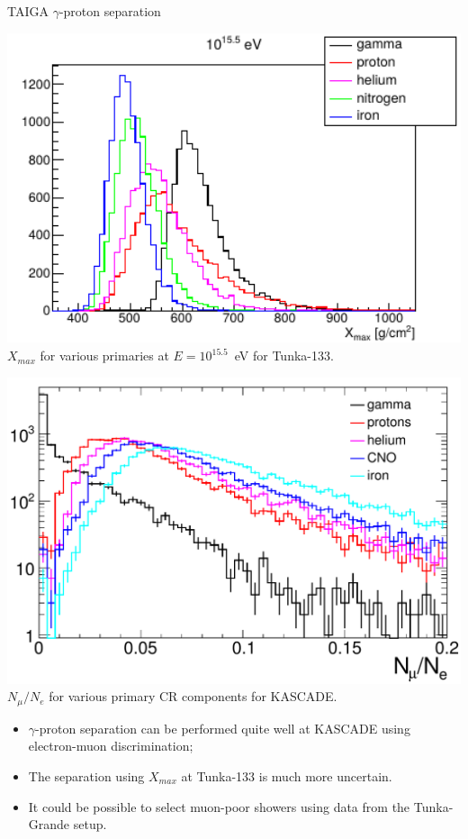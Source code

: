 \begin{frame}{TAIGA $\gamma$-proton separation}
\begin{minipage}[c]{0.49\textwidth}
  \begin{center}
    \includegraphics[width=1\textwidth]{pics/tunka_gamma_cr_diff.pdf}\\\small
    $X_{max}$ for various primaries at $E = 10^{15.5}$~eV for Tunka-133.
  \end{center}
\end{minipage}
\hfill
\begin{minipage}[c]{0.49\textwidth}
  \begin{center}
    \includegraphics[width=1\textwidth]{pics/Nmu_Ne.pdf}\\\small
    $N_\mu / N_e$ for various primary CR components for KASCADE.
  \end{center}
\end{minipage}
\vspace{1ex}\small
\begin{itemize}
\setlength{\itemsep}{0pt}
\setlength{\parsep}{0pt}
\setlength{\parskip}{0pt}
  \item $\gamma$-proton separation can be performed quite well at KASCADE using electron-muon discrimination;
  \item The separation using $X_{max}$ at Tunka-133 is much more uncertain.
  \item It could be possible to select muon-poor showers using data from the Tunka-Grande setup.
\end{itemize}
\end{frame}
